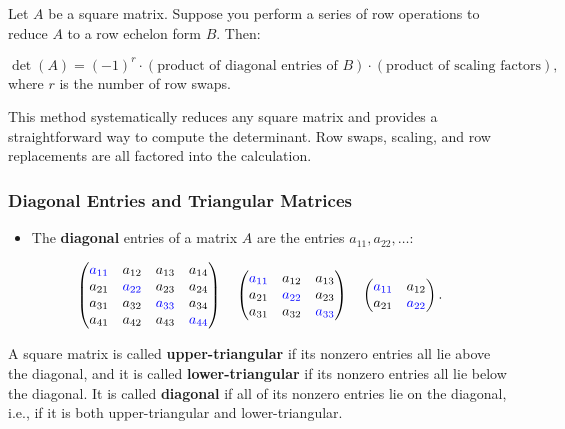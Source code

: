 \documentclass[a4paper,12pt]{article}
\begin{document}
\begin{tcolorbox}[title=Recipe: Computing Determinants by Row Reducing, colframe=blue!70!black, colback=blue!5!white]
\small
Let \(A\) be a square matrix. Suppose you perform a series of row operations to reduce \(A\) to a row echelon form \(B\). Then:

\[
\det(A) = (-1)^r \cdot \left(\text{product of diagonal entries of } B\right) \cdot \left(\text{product of scaling factors}\right),
\]
where \(r\) is the number of row swaps.
\end{tcolorbox}

This method systematically reduces any square matrix and provides a straightforward way to compute the determinant. Row swaps, scaling, and row replacements are all factored into the calculation.


\subsubsection*{Diagonal Entries and Triangular Matrices}

\begin{tcolorbox}[title=Definition, colframe=blue!70!black, colback=blue!5!white]
\begin{itemize}
    \item The \textbf{diagonal} entries of a matrix \(A\) are the entries \(a_{11}, a_{22}, \dots\):
\end{itemize}

\[
\begin{pmatrix}
\textcolor{blue}{a_{11}} & a_{12} & a_{13} & a_{14} \\
a_{21} & \textcolor{blue}{a_{22}} & a_{23} & a_{24} \\
a_{31} & a_{32} & \textcolor{blue}{a_{33}} & a_{34} \\
a_{41} & a_{42} & a_{43} & \textcolor{blue}{a_{44}}
\end{pmatrix}
\quad
\begin{pmatrix}
\textcolor{blue}{a_{11}} & a_{12} & a_{13} \\
a_{21} & \textcolor{blue}{a_{22}} & a_{23} \\
a_{31} & a_{32} & \textcolor{blue}{a_{33}}
\end{pmatrix}
\quad
\begin{pmatrix}
\textcolor{blue}{a_{11}} & a_{12} \\
a_{21} & \textcolor{blue}{a_{22}}
\end{pmatrix}.
\]

\noindent A square matrix is called \textbf{upper-triangular} if its nonzero entries all lie above the diagonal, and it is called \textbf{lower-triangular} if its nonzero entries all lie below the diagonal. It is called \textbf{diagonal} if all of its nonzero entries lie on the diagonal, i.e., if it is both upper-triangular and lower-triangular.
\end{tcolorbox}
\end{document}
